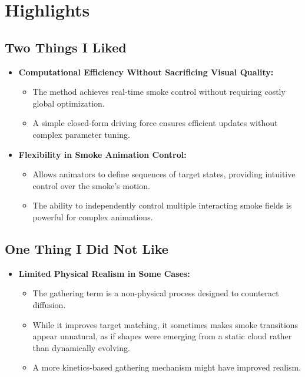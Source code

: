 \documentclass[11pt]{article}
\begin{document}
\section{Highlights}
\subsection{Two Things I Liked}
\begin{itemize}
    \item \textbf{Computational Efficiency Without Sacrificing Visual Quality:}
    \begin{itemize}
        \item The method achieves real-time smoke control without requiring costly global optimization.
        \item A simple closed-form driving force ensures efficient updates without complex parameter tuning.
    \end{itemize}
    \item \textbf{Flexibility in Smoke Animation Control:}
    \begin{itemize}
        \item Allows animators to define sequences of target states, providing intuitive control over the smoke’s motion.
        \item The ability to independently control multiple interacting smoke fields is powerful for complex animations.
    \end{itemize}
\end{itemize}

\subsection{One Thing I Did Not Like}
\begin{itemize}
    \item \textbf{Limited Physical Realism in Some Cases:}
    \begin{itemize}
        \item The gathering term is a non-physical process designed to counteract diffusion.
        \item While it improves target matching, it sometimes makes smoke transitions appear unnatural, as if shapes were emerging from a static cloud rather than dynamically evolving.
        \item A more kinetics-based gathering mechanism might have improved realism.
    \end{itemize}
\end{itemize}
\end{document}

